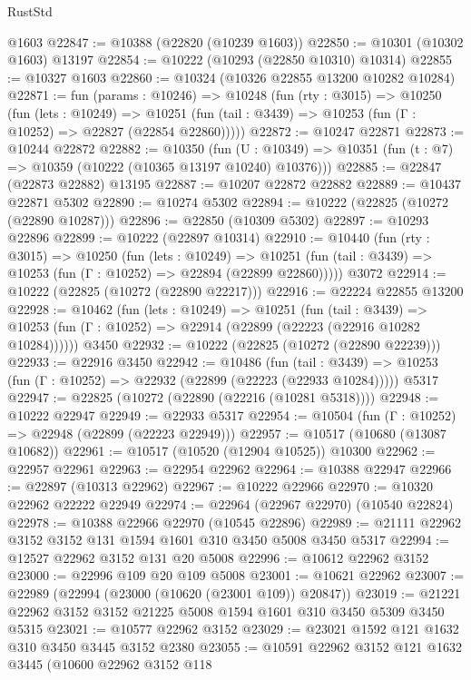 \begin{lexlean}{RustStd}
\begin{coremodule}
    @1603
@22847 := @10388 (@22820 (@10239 @1603))
@22850 := @10301 (@10302 @1603) @13197
@22854 := @10222 (@10293 (@22850 @10310) @10314)
@22855 := @10327 @1603
@22860 := @10324 (@10326 @22855 @13200 @10282 @10284)
@22871 := fun (params : @10246) =>
  @10248
    (fun (rty : @3015) =>
    @10250
      (fun (lets : @10249) =>
      @10251 (fun (tail : @3439) => @10253 (fun (Γ : @10252) => @22827 (@22854 @22860)))))
@22872 := @10247 @22871
@22873 := @10244 @22872
@22882 := @10350
    (fun (U : @10349) => @10351 (fun (t : @7) => @10359 (@10222 (@10365 @13197 @10240) @10376)))
@22885 := @22847 (@22873 @22882) @13195
@22887 := @10207 @22872 @22882
@22889 := @10437 @22871 @5302
@22890 := @10274 @5302
@22894 := @10222 (@22825 (@10272 (@22890 @10287)))
@22896 := @22850 (@10309 @5302)
@22897 := @10293 @22896
@22899 := @10222 (@22897 @10314)
@22910 := @10440
    (fun (rty : @3015) =>
    @10250
      (fun (lets : @10249) =>
      @10251 (fun (tail : @3439) => @10253 (fun (Γ : @10252) => @22894 (@22899 @22860)))))
    @3072
@22914 := @10222 (@22825 (@10272 (@22890 @22217)))
@22916 := @22224 @22855 @13200
@22928 := @10462
    (fun (lets : @10249) =>
    @10251
      (fun (tail : @3439) =>
      @10253 (fun (Γ : @10252) => @22914 (@22899 (@22223 (@22916 @10282 @10284))))))
    @3450
@22932 := @10222 (@22825 (@10272 (@22890 @22239)))
@22933 := @22916 @3450
@22942 := @10486
    (fun (tail : @3439) => @10253 (fun (Γ : @10252) => @22932 (@22899 (@22223 (@22933 @10284)))))
    @5317
@22947 := @22825 (@10272 (@22890 (@22216 (@10281 @5318))))
@22948 := @10222 @22947
@22949 := @22933 @5317
@22954 := @10504 (fun (Γ : @10252) => @22948 (@22899 (@22223 @22949)))
@22957 := @10517 (@10680 (@13087 @10682))
@22961 := @10517 (@10520 (@12904 @10525)) @10300
@22962 := @22957 @22961
@22963 := @22954 @22962
@22964 := @10388 @22947
@22966 := @22897 (@10313 @22962)
@22967 := @10222 @22966
@22970 := @10320 @22962 @22222 @22949
@22974 := @22964 (@22967 @22970) (@10540 @22824)
@22978 := @10388 @22966 @22970 (@10545 @22896)
@22989 := @21111 @22962 @3152 @3152 @131 @1594 @1601 @310 @3450 @5008 @3450 @5317
@22994 := @12527 @22962 @3152 @131 @20 @5008
@22996 := @10612 @22962 @3152
@23000 := @22996 @109 @20 @109 @5008
@23001 := @10621 @22962
@23007 := @22989 (@22994 (@23000 (@10620 (@23001 @109)) @20847))
@23019 := @21221 @22962 @3152 @3152 @21225 @5008 @1594 @1601 @310 @3450 @5309 @3450 @5315
@23021 := @10577 @22962 @3152
@23029 := @23021 @1592 @121 @1632 @310 @3450 @3445 @3152 @2380
@23055 := @10591
    @22962
    @3152
    @121
    @1632
    @3445
    (@10600
      @22962
      @3152
      @118

\end{coremodule}
\end{lexlean}

